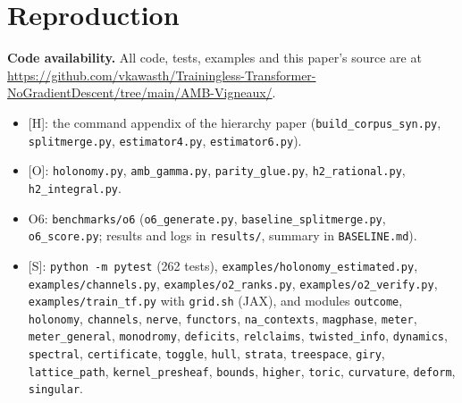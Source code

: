 \documentclass[11pt]{article}
\theoremstyle{definition}
\theoremstyle{remark}
\newcommand{\src}[1]{\textsf{\small[#1]}}
\begin{document}
\section{Reproduction}
\textbf{Code availability.} All code, tests, examples and this paper's source are at \url{https://github.com/vkawasth/Trainingless-Transformer-NoGradientDescent/tree/main/AMB-Vigneaux/}.
\begin{itemize}
  \item \src{H}: the command appendix of the hierarchy paper (\texttt{build\_corpus\_syn.py}, \texttt{splitmerge.py}, \texttt{estimator4.py}, \texttt{estimator6.py}).
  \item \src{O}: \texttt{holonomy.py}, \texttt{amb\_gamma.py}, \texttt{parity\_glue.py}, \texttt{h2\_rational.py}, \texttt{h2\_integral.py}.
  \item O6: \texttt{benchmarks/o6} (\texttt{o6\_generate.py}, \texttt{baseline\_splitmerge.py}, \texttt{o6\_score.py}; results and logs in \texttt{results/}, summary in \texttt{BASELINE.md}).
  \item \src{S}: \texttt{python -m pytest} (262 tests), \texttt{examples/holonomy\_estimated.py}, \texttt{examples/channels.py}, \texttt{examples/o2\_ranks.py}, \texttt{examples/o2\_verify.py}, \texttt{examples/train\_tf.py} with \texttt{grid.sh} (JAX), and modules \texttt{outcome}, \texttt{holonomy}, \texttt{channels}, \texttt{nerve}, \texttt{functors}, \texttt{na\_contexts}, \texttt{magphase}, \texttt{meter}, \texttt{meter\_general}, \texttt{monodromy}, \texttt{deficits}, \texttt{relclaims}, \texttt{twisted\_info}, \texttt{dynamics}, \texttt{spectral}, \texttt{certificate}, \texttt{toggle}, \texttt{hull}, \texttt{strata}, \texttt{treespace}, \texttt{giry}, \texttt{lattice\_path}, \texttt{kernel\_presheaf}, \texttt{bounds}, \texttt{higher}, \texttt{toric}, \texttt{curvature}, \texttt{deform}, \texttt{singular}.
\end{itemize}
\end{document}
